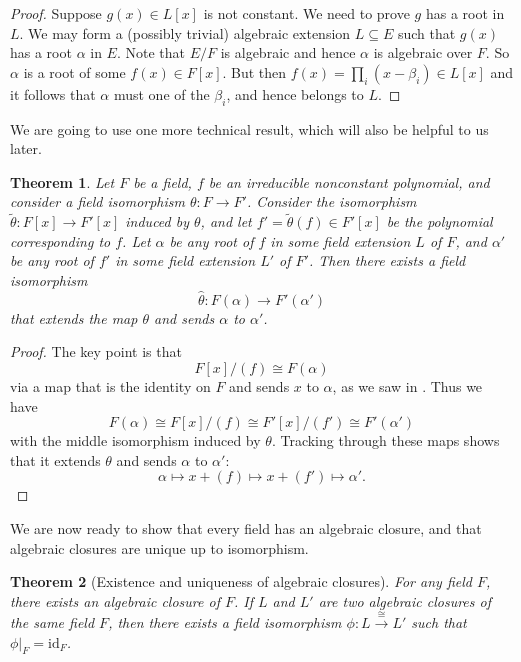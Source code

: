 \documentclass[12pt]{report}
\newtheorem{theorem}{Theorem}[chapter]
\numberwithin{equation}{section}
\numberwithin{theorem}{chapter}
\theoremstyle{definition}
\newtheorem*{basic properties}{Basic Properties}
\newtheorem*{Important Remark}{Important Remark}
\begin{document}
\begin{proof}
Suppose $g(x) \in L[x]$ is not constant. We need to prove $g$ has a root in $L$.
We may form a (possibly trivial) algebraic extension $L \subseteq E$ such that $g(x)$ has a root $\alpha$ in $E$. Note that $E/F$ is algebraic and hence $\alpha$ is algebraic over $F$. So $\alpha$ is a root of some $f(x) \in F[x]$. But then $f(x) = \prod_i (x - \beta_i) \in L[x]$ and it follows that $\alpha$ must one of the $\beta_i$, and hence belongs to $L$.
\end{proof}


We are going to use one more technical result, which will also be helpful to us later.


\begin{theorem}\label{extending identity on F to iso}
Let $F$ be a field, $f$ be an irreducible nonconstant polynomial, and consider a field isomorphism $\theta\!: F \to F'$. Consider the isomorphism $\tilde\theta\!:F[x] \to F'[x]$ induced by $\theta$, and let $f'=\tilde\theta(f) \in F'[x]$ be the polynomial corresponding to $f$. 
Let $\alpha$ be any root of $f$ in some field extension $L$ of $F$, and $\alpha'$ be any root of $f'$ in some
  field extension $L'$ of $F'$. Then there exists a field isomorphism
$$\widehat{\theta}: F(\alpha) \to F'(\alpha')$$
that extends the map $\theta$ and sends $\alpha$ to $\alpha'$.
\end{theorem}

\begin{proof}
The key point is that
$$F[x]/(f) \cong F(\alpha)$$
via a map that is the identity on $F$ and sends $x$ to $\alpha$, as we
saw in . Thus we have
$$F(\alpha) \cong F[x]/(f) \cong F'[x]/(f') \cong F'(\alpha')$$
with the middle isomorphism induced by $\theta$. Tracking through these
maps shows that it extends $\theta$ and sends $\alpha$ to $\alpha'$:
$$\alpha \mapsto x + (f) \mapsto x + (f') \mapsto \alpha'.$$
\end{proof}



We are now ready to show that every field has an algebraic closure, and that algebraic closures are unique up to isomorphism. 

\begin{theorem}[Existence and uniqueness of algebraic closures]\label{existence and uniqueness of algebraic closures}
For any field $F$, there exists an algebraic closure of $F$. If $L$ and $L'$ are two algebraic closures of the same field $F$, then there exists a field isomorphism $\phi: L \xrightarrow{\cong} L'$ such that $\phi|_F = \mathrm{id}_F$.
\end{theorem}
\end{document}
